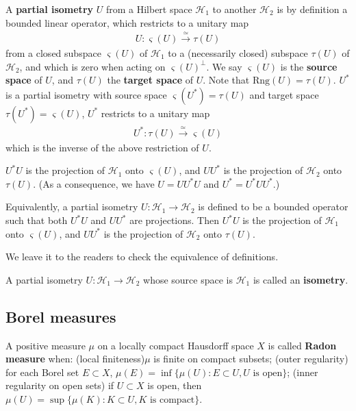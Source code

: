 \documentclass[12pt,b5paper,notitlepage]{article}
\theoremstyle{definition}
\theoremstyle{plain}
\newcommand{\mc}{\mathcal}
\newcommand{\sgm}{\varsigma}
\newcommand{\Rng}{\mathrm{Rng}}
\numberwithin{equation}{section}
\begin{document}
A \textbf{partial isometry} $U$ from a Hilbert space $\mc H_1$ to another $\mc H_2$ is by definition a bounded linear operator, which restricts to a unitary map
\begin{align*}
U:\sgm(U)\xrightarrow{\simeq}\tau(U)	
\end{align*}
from a closed subspace $\sgm(U)$ of $\mc H_1$ to a (necessarily closed) subspace $\tau(U)$ of $\mc H_2$, and which is zero when acting on $\sgm(U)^\perp$. We say $\varsigma(U)$ is the \textbf{source space} of $U$, and $\tau(U)$ the \textbf{target space} of $U$.  Note that $\Rng(U)=\tau(U)$. $U^*$ is a partial isometry with source space $\varsigma(U^*)=\tau(U)$ and target space $\tau(U^*)=\varsigma(U)$, $U^*$ restricts to a unitary map
\begin{align*}
U^*:\tau(U)\xrightarrow{\simeq}\sgm(U)	
\end{align*}
which is the inverse of the above restriction of $U$.

$U^*U$ is the projection of $\mc H_1$ onto $\varsigma(U)$, and $UU^*$ is the projection of $\mc H_2$ onto $\tau(U)$. (As a consequence, we have $U=UU^*U$ and $U^*=U^*UU^*$.)

Equivalently, a partial isometry $U:\mc H_1\rightarrow\mc H_2$ is defined to be a bounded operator such that both $U^*U$ and $UU^*$ are projections. Then $U^*U$ is the projection of $\mc H_1$ onto $\varsigma(U)$, and $UU^*$ is the projection of $\mc H_2$ onto $\tau(U)$. 

We leave it to the readers to check the equivalence of definitions.

A partial isometry $U:\mc H_1\rightarrow\mc H_2$ whose source space is $\mc H_1$ is called an \textbf{isometry}.

\subsection*{Borel measures}



A positive measure $\mu$ on a locally compact Hausdorff space $X$ is called \textbf{Radon measure} when: (local finiteness)$\mu$ is finite on compact subsets; (outer regularity) for each Borel set $E\subset X$, $\mu(E)=\inf\{\mu(U):E\subset U,U\text{ is open}\}$; (inner regularity on open sets) if $U\subset X$ is open,   then $\mu(U)=\sup\{\mu(K):K\subset U,K\text{ is compact}\}$.  

\end{document}
